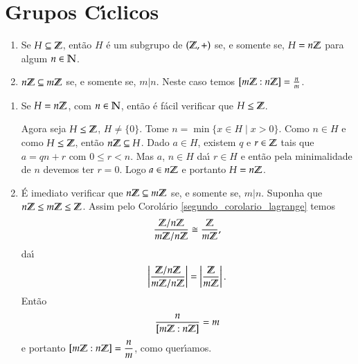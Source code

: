 \section{Grupos C{\'\i}clicos} %
\label{sec:grupos_ciclicos}

\begin{proposicao}
	\begin{enumerate}[label=({\roman*})]
		\item Se $H \subseteq \mathbb{Z}$, ent\~ao $H$ \'e um subgrupo de $(\mathbb{Z}, +)$ se, e somente se, $H = n\mathbb{Z}$ para algum $n \in \mathbb{N}$.
		
		\item $n\mathbb{Z} \subseteq m\mathbb{Z}$ se, e somente se, $m | n$. Neste caso temos $[m\mathbb{Z} : n\mathbb{Z}] = \frac{n}{m}$.
	\end{enumerate}
\end{proposicao}
\begin{prova}
	\begin{enumerate}[label=({\roman*})]
		\item Se $H = n\mathbb{Z}$, com $n \in \mathbb{N}$, ent\~ao \'e f\'acil verificar que $H \le \mathbb{Z}$.

		Agora seja $H \le \mathbb{Z}$, $H \ne \{0\}$. Tome $n = \min\{x \in H \mid x > 0\}$. Como $n \in H$ e como $H \le \mathbb{Z}$, ent\~ao $n\mathbb{Z} \subseteq H$. Dado $a \in H$, existem $q$ e $r \in \mathbb{Z}$ tais que $a = qn + r$ com $0 \le r < n$. Mas $a$, $n \in H$ da{\'\i} $r \in H$ e ent\~ao pela minimalidade de $n$ devemos ter $r = 0$. Logo $a \in n\mathbb{Z}$ e portanto $H = n\mathbb{Z}$.

		\item \'E imediato verificar que $n\mathbb{Z} \subseteq m\mathbb{Z}$ se, e somente se, $m | n$. Suponha que $n\mathbb{Z} \le m\mathbb{Z} \le \mathbb{Z}$. Assim pelo Corol\'ario \ref{segundo_corolario_lagrange} temos
		\[
			\dfrac{\mathbb{Z}/n\mathbb{Z}}{m\mathbb{Z}/n\mathbb{Z}} \cong \dfrac{\mathbb{Z}}{m\mathbb{Z}},
		\]
		da{\'\i}
		\[
			\left|\dfrac{\mathbb{Z}/n\mathbb{Z}}{m\mathbb{Z}/n\mathbb{Z}}\right| = \left|\dfrac{\mathbb{Z}}{m\mathbb{Z}}\right|.
		\]
		Ent\~ao
		\[
			\dfrac{n}{[m\mathbb{Z} : n\mathbb{Z}]} = m
		\]
		e portanto $[m\mathbb{Z} : n\mathbb{Z}] = \dfrac{n}{m}$, como quer{\'\i}amos.

	\end{enumerate}
\end{prova}

